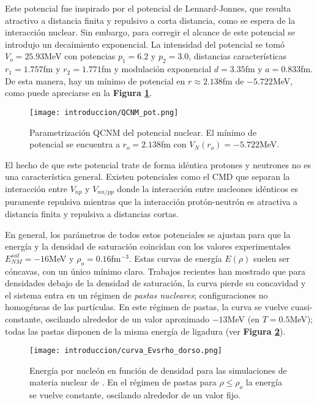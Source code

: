 Este potencial fue inspirado por el potencial de Lennard-Jonnes, que resulta atractivo a distancia finita y repulsivo a corta distancia, como se espera de la interacción nuclear.
Sin embargo, para corregir el alcance de este potencial se introdujo un decaimiento exponencial.
La intensidad del potencial se tomó $V_o=25.93$MeV con potencias $p_1=6.2$ y $p_2=3.0$, distancias características $r_1=1.757$fm y $r_2=1.771$fm y modulación exponencial $d=3.35$fm y $a=0.833$fm.
De esta manera, hay un mínimo de potencial en $r\approx 2.138$fm de $-5.722$MeV, como puede apreciarse en la \textbf{Figura \ref{fig:graf_QCNM}}.

\begin{figure}[H]
	\centering
	\texttt{[image: introduccion/QCNM\_pot.png]}
	\caption{Parametrización QCNM del potencial nuclear. 
	El mínimo de potencial se encuentra a $r_o=2.138$fm con $V_N(r_o)=-5.722$MeV.}
	\label{fig:graf_QCNM}
\end{figure}

El hecho de que este potencial trate de forma idéntica protones y neutrones no es una característica general.
Existen potenciales como el CMD que separan la interacción entre $V_{np}$ y $V_{nn/pp}$ donde la interacción entre nucleones idénticos es puramente repulsiva mientras que la interacción protón-neutrón 
es atractiva a distancia finita y repulsiva a distancias cortas.

En general, los parámetros de todos estos potenciales se ajustan para que la energía y la densidad de saturación coincidan con los valores experimentales $E_{NM}^{sat}=-16$MeV y $\rho_o=0.16$fm$^{-3}$\cite{Dorso1988}.
Estas curvas de energía $E(\rho)$ suelen ser cóncavas, con un único mínimo claro.
Trabajos recientes \cite{Schrader2009,GimenezMolinelli2014, GimenezMolinelli2015} han mostrado que para densidades debajo de la densidad de saturación, la curva pierde su concavidad y el sistema entra en un 
régimen de \textit{pastas nucleares}; configuraciones no homogéneas de las partículas.
En este régimen de pastas, la curva se vuelve cuasi-constante, oscilando alrededor de un valor aproximado $-13$MeV (en $T=0.5$MeV)\cite{Dorso2018}; todas las pastas disponen de la misma energía de ligadura (ver \textbf{Figura \ref{fig:curva_Evsrho_dorso}}).

\begin{figure}[H]
	\centering
	\texttt{[image: introduccion/curva\_Evsrho\_dorso.png]}
	\caption{Energía por nucleón en función de densidad para las simulaciones de materia nuclear de \cite{Dorso2018}.
	En el régimen de pastas para $\rho\leq\rho_o$ la energía se vuelve constante, oscilando alrededor de un valor fijo.}
	\label{fig:curva_Evsrho_dorso}
\end{figure}

